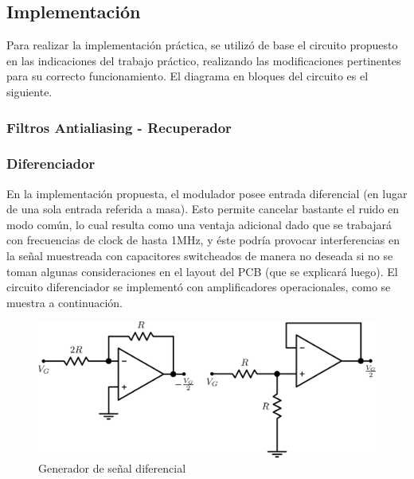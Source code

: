 \documentclass[assd_tp3_main.tex]{subfiles}
\begin{document}
\subsection{Implementación}

Para realizar la implementación práctica, se utilizó de base el circuito propuesto en las indicaciones del trabajo práctico, realizando las modificaciones pertinentes para su correcto funcionamiento. El diagrama en bloques del circuito es el siguiente.


\subsubsection{Filtros Antialiasing - Recuperador}


\subsubsection{Diferenciador}

En la implementación propuesta, el modulador posee entrada diferencial (en lugar de una sola entrada referida a masa). Esto permite cancelar bastante el ruido en modo común, lo cual resulta como una ventaja adicional dado que se trabajará con frecuencias de clock de hasta 1MHz, y éste podría provocar interferencias en la señal muestreada con capacitores switcheados de manera no deseada si no se toman algunas consideraciones en el layout del PCB (que se explicará luego). El circuito diferenciador se implementó con amplificadores operacionales, como se muestra a continuación.

\begin{figure}[!ht]
\begin{centering}
\includegraphics[scale=0.5]{images/ej5/diferenciador.png}
\par\end{centering}
\caption{Generador de señal diferencial}
\end{figure}
\end{document}
